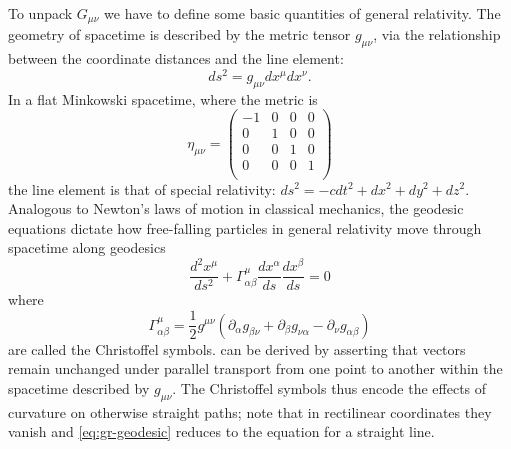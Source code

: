 To unpack $G_{\mu\nu}$ we have to define some basic quantities of general relativity.
The geometry of spacetime is described by the metric tensor $g_{\mu\nu}$, via the relationship between the coordinate distances and the line element:
\begin{equation}
	ds^2 = g_{\mu\nu}dx^{\mu}dx^{\nu}.
\end{equation}
In a flat Minkowski spacetime, where the metric is
\begin{equation}
	\eta_{\mu\nu} = \left(
			\begin{matrix}
				-1 & 0 & 0 & 0\\
			  0 & 1 & 0 & 0\\
				0 & 0 & 1 & 0\\
				0 & 0 & 0 & 1\\
			\end{matrix}
		\right)
\end{equation}
the line element is that of special relativity: $ds^2 = -cdt^2 + dx^2 + dy^2 + dz^2$.
Analogous to Newton's laws of motion in classical mechanics, the geodesic equations dictate how free-falling particles in general relativity move through spacetime along geodesics
\begin{equation}\label{eq:gr-geodesic}
	\frac{d^2x^{\mu}}{ds^2} + \Gamma_{\alpha \beta}^{\mu} \frac{dx^{\alpha}}{ds} \frac{dx^{\beta}}{ds} = 0
\end{equation}
where
\begin{equation}\label{eq:gr-christoffel}
	\Gamma_{\alpha \beta}^{\mu} = \frac{1}{2} g^{\mu\nu} \left( \partial_{\alpha} g_{\beta\nu} + \partial_{\beta} g_{\nu\alpha} - \partial_{\nu} g_{\alpha\beta} \right)
\end{equation}
are called the Christoffel symbols.
 can be derived by asserting that vectors remain unchanged under parallel transport from one point to another within the spacetime described by $g_{\mu\nu}$.
The Christoffel symbols thus encode the effects of curvature on otherwise straight paths; note that in rectilinear coordinates they vanish and \cref{eq:gr-geodesic} reduces to the equation for a straight line.

